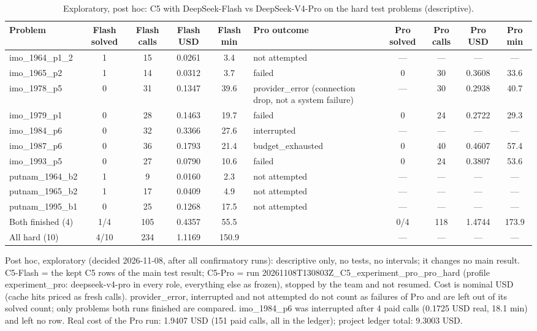 \begin{table}[t]
\centering
\scriptsize
\setlength{\tabcolsep}{3pt}
\caption{Exploratory, post hoc: C5 with DeepSeek-Flash vs DeepSeek-V4-Pro on the hard test problems (descriptive).}
\label{tab:pro-hard}
\begin{tabular}{lcccclcccc}
\toprule
Problem & Flash solved & Flash calls & Flash USD & Flash min & Pro outcome & Pro solved & Pro calls & Pro USD & Pro min \\
\midrule
imo\_1964\_p1\_2 & 1 & 15 & 0.0261 & 3.4 & not attempted & --- & --- & --- & --- \\
imo\_1965\_p2 & 1 & 14 & 0.0312 & 3.7 & failed & 0 & 30 & 0.3608 & 33.6 \\
imo\_1978\_p5 & 0 & 31 & 0.1347 & 39.6 & provider\_error (connection drop, not a system failure) & --- & 30 & 0.2938 & 40.7 \\
imo\_1979\_p1 & 0 & 28 & 0.1463 & 19.7 & failed & 0 & 24 & 0.2722 & 29.3 \\
imo\_1984\_p6 & 0 & 32 & 0.3366 & 27.6 & interrupted & --- & --- & --- & --- \\
imo\_1987\_p6 & 0 & 36 & 0.1793 & 21.4 & budget\_exhausted & 0 & 40 & 0.4607 & 57.4 \\
imo\_1993\_p5 & 0 & 27 & 0.0790 & 10.6 & failed & 0 & 24 & 0.3807 & 53.6 \\
putnam\_1964\_b2 & 1 & 9 & 0.0160 & 2.3 & not attempted & --- & --- & --- & --- \\
putnam\_1965\_b2 & 1 & 17 & 0.0409 & 4.9 & not attempted & --- & --- & --- & --- \\
putnam\_1995\_b1 & 0 & 25 & 0.1268 & 17.5 & not attempted & --- & --- & --- & --- \\
\midrule
Both finished (4) & 1/4 & 105 & 0.4357 & 55.5 &  & 0/4 & 118 & 1.4744 & 173.9 \\
All hard (10) & 4/10 & 234 & 1.1169 & 150.9 &  & --- & --- & --- & --- \\
\bottomrule
\end{tabular}

\vspace{2pt}
\parbox{\linewidth}{\scriptsize Post hoc, exploratory (decided 2026-11-08, after all confirmatory runs): descriptive only, no tests, no intervals; it changes no main result. C5-Flash = the kept C5 rows of the main test result; C5-Pro = run 20261108T130803Z\_C5\_experiment\_pro\_pro\_hard (profile experiment\_pro: deepseek-v4-pro in every role, everything else as frozen), stopped by the team and not resumed. Cost is nominal USD (cache hits priced as fresh calls). provider\_error, interrupted and not attempted do not count as failures of Pro and are left out of its solved count; only problems both runs finished are compared. imo\_1984\_p6 was interrupted after 4 paid calls (0.1725 USD real, 18.1 min) and left no row. Real cost of the Pro run: 1.9407 USD (151 paid calls, all in the ledger); project ledger total: 9.3003 USD.}
\end{table}

